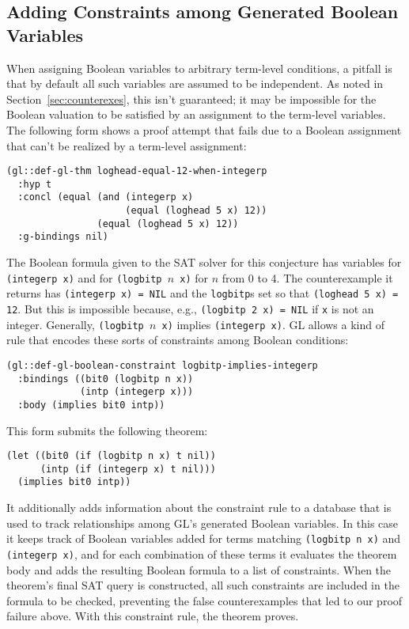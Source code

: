 \documentclass[submission,copyright,creativecommons]{eptcs}
\newcommand*{\var}[1]{\mathit{#1}}
\begin{document}
\subsection{Adding Constraints among Generated Boolean Variables}
\label{sec:constraintgen}
When assigning Boolean variables to arbitrary term-level conditions, a
pitfall is that by default all such variables are assumed to be
independent.  As noted in Section~\ref{sec:counterexes}, this isn't
guaranteed; it may be impossible for the Boolean valuation to be
satisfied by an assignment to the term-level variables.  The following
form shows a proof attempt that fails due to a Boolean assignment that can't be realized by a term-level assignment:
\begin{verbatim}
(gl::def-gl-thm loghead-equal-12-when-integerp
  :hyp t
  :concl (equal (and (integerp x)
                     (equal (loghead 5 x) 12))
                (equal (loghead 5 x) 12))
  :g-bindings nil)
\end{verbatim}
\noindent The Boolean formula given to the SAT solver for this
conjecture has variables for \texttt{(integerp x)} and for
\texttt{(logbitp $\var{n}$ x)} for $\var{n}$ from 0 to 4.  The
counterexample it returns has \texttt{(integerp x) = NIL} and the
\texttt{logbitp}s set so that \texttt{(loghead 5 x) = 12}.  But this
is impossible because, e.g., \texttt{(logbitp 2 x) = NIL} if
\texttt{x} is not an integer.  Generally, \texttt{(logbitp $\var{n}$
  x)} implies \texttt{(integerp x)}.  GL allows a kind of rule that
encodes these sorts of constraints among Boolean conditions:
\begin{verbatim}
(gl::def-gl-boolean-constraint logbitp-implies-integerp
  :bindings ((bit0 (logbitp n x))
             (intp (integerp x)))
  :body (implies bit0 intp))
\end{verbatim}
\noindent This form submits the following theorem:
\begin{verbatim}
(let ((bit0 (if (logbitp n x) t nil))
      (intp (if (integerp x) t nil)))
  (implies bit0 intp))
\end{verbatim}
\noindent It additionally adds information about the constraint rule
to a database that is used to track relationships among GL's generated
Boolean variables.  In this case it keeps track of Boolean variables
added for terms matching \texttt{(logbitp n x)} and \texttt{(integerp
  x)}, and for each combination of these terms it evaluates the
theorem body and adds the resulting Boolean formula to a list of
constraints.  When the theorem's final SAT query is constructed, all
such constraints are included in the formula to be checked, preventing
the false counterexamples that led to our proof failure above.  With
this constraint rule, the theorem proves.
\end{document}
